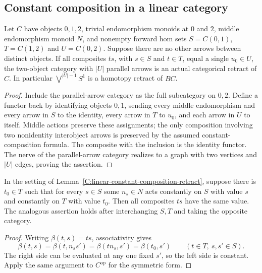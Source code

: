 \subsection{Constant composition in a linear category}

\begin{lemma}
\label{C:linear-constant-composition-retract}
Let $C$ have objects $0,1,2$, trivial endomorphism monoids at
$0$ and $2$, middle endomorphism monoid $N$, and nonempty forward
hom sets $S=C(0,1)$, $T=C(1,2)$ and $U=C(0,2)$.
Suppose there are no other arrows between distinct objects.
If all composites $ts$, with $s\in S$ and $t\in T$, equal a
single $u_0\in U$, the two-object category with $|U|$ parallel
arrows is an actual categorical retract of $C$.
In particular $\bigvee^{|U|-1}S^1$ is a homotopy retract of $BC$.
\end{lemma}
\begin{proof}
Include the parallel-arrow category as the full subcategory on
$0,2$. Define a functor back by identifying objects $0,1$,
sending every middle endomorphism and every arrow in $S$ to
the identity, every arrow in $T$ to $u_0$, and each arrow in
$U$ to itself. Middle actions preserve these assignments;
the only composition involving two nonidentity interobject
arrows is preserved by the assumed constant-composition formula.
The composite with the inclusion is the identity functor.
The nerve of the parallel-arrow category realizes to a graph
with two vertices and $|U|$ edges, proving the assertion.
\end{proof}

\begin{lemma}
\label{C:linear-constant-profiles}
In the setting of Lemma~\ref{C:linear-constant-composition-retract},
suppose there is $t_0\in T$ such that for every $s\in S$ some
$n_s\in N$ acts constantly on $S$ with value $s$ and constantly
on $T$ with value $t_0$. Then all composites $ts$ have the same
value. The analogous assertion holds after interchanging $S,T$
and taking the opposite category.
\end{lemma}
\begin{proof}
Writing $\beta(t,s)=ts$, associativity gives
\[
 \beta(t,s)=\beta(t,n_s s')
 =\beta(tn_s,s')=\beta(t_0,s')
 \qquad(t\in T,\ s,s'\in S).
\]
The right side can be evaluated at any one fixed $s'$, so the
left side is constant. Apply the same argument to $C^{\mathrm{op}}$
for the symmetric form.
\end{proof}

